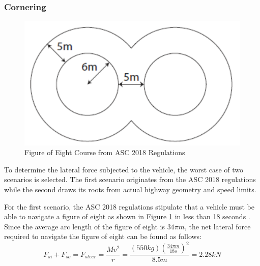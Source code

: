 \documentclass[12pt]{article}
\begin{document}
\subsubsection{Cornering}
\begin{figure}[h!]
	\centering
	\includegraphics[width=.5\textwidth]{./LaTex/dynamicScrutineering.PNG}
	\caption{Figure of Eight Course from ASC 2018 Regulations 
	\cite{ASC2018regs}}
	\label{fig:dynamicScrutineering}
\end{figure}
To determine the lateral force subjected to the vehicle, the worst case of two scenarios is selected. The first scenario originates from the ASC 2018 regulations while the second draws its roots from actual highway geometry and speed limits. 

For the first scenario, the ASC 2018 regulations stipulate that a vehicle must be able to navigate a figure of eight as shown in Figure \ref{fig:dynamicScrutineering} in less than 18 seconds \cite{ASC2018regs}. Since the average arc length of the figure of eight is $34\pi m$, the net lateral force required to navigate the figure of eight can be found as follows:
\begin{equation}
	F_{si} + F_{so} = F_{steer} = \frac{Mv^2}{r} = \frac{(550kg)\left(\frac{34\pi m}{18s}\right)^2}{8.5m} = 2.28kN
\end{equation}
\end{document}

